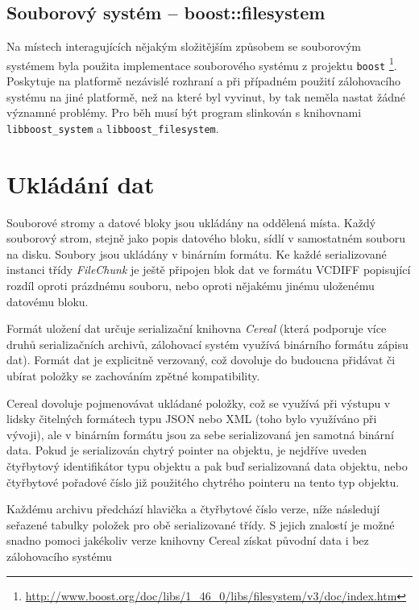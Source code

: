 \subsection*{Souborový systém -- boost::filesystem}

Na místech interagujících nějakým složitějším způsobem se souborovým systémem
byla použita implementace souborového systému z \Cpp projektu \texttt{boost}%
\footnote{\url{http://www.boost.org/doc/libs/1_46_0/libs/filesystem/v3/doc/index.htm}}.
Poskytuje na platformě nezávislé rozhraní a při případném použití zálohovacího
systému na jiné platformě, než na které byl vyvinut, by tak neměla nastat žádné
významné problémy. Pro běh musí být program slinkován s knihovnami
\texttt{libboost\_system} a \texttt{libboost\_filesystem}.

\section{Ukládání dat}

Souborové stromy a datové bloky jsou ukládány na oddělená místa. Každý souborový
strom, stejně jako popis datového bloku, sídlí v samostatném souboru na disku.
Soubory jsou ukládány v binárním formátu. Ke každé serializované instanci třídy
{\it FileChunk} je ještě připojen blok dat ve formátu \gls{VCDIFF} popisující
rozdíl oproti prázdnému souboru, nebo oproti nějakému jinému uloženému datovému
bloku.

Formát uložení dat určuje serializační knihovna {\it Cereal} (která podporuje
více druhů serializačních archivů, zálohovací systém využívá binárního formátu
zápisu dat). Formát dat je explicitně verzovaný, což dovoluje do budoucna
přidávat či ubírat položky se zachováním zpětné kompatibility.

Cereal dovoluje pojmenovávat ukládané položky, což se využívá při výstupu v
lidsky čitelných formátech typu JSON nebo XML (toho bylo využíváno při vývoji),
ale v binárním formátu jsou za sebe serializovaná jen samotná binární data. Pokud
je serializován chytrý pointer na objektu, je nejdříve uveden čtyřbytový
identifikátor typu objektu a pak buď serializovaná data objektu, nebo čtyřbytové
pořadové číslo již použitého chytrého pointeru na tento typ objektu.

Každému archivu předchází hlavička a čtyřbytové číslo verze, níže následují
seřazené tabulky položek pro obě serializované třídy. S jejich znalostí je možné
snadno pomoci jakékoliv verze knihovny Cereal získat původní data i bez
zálohovacího systému

